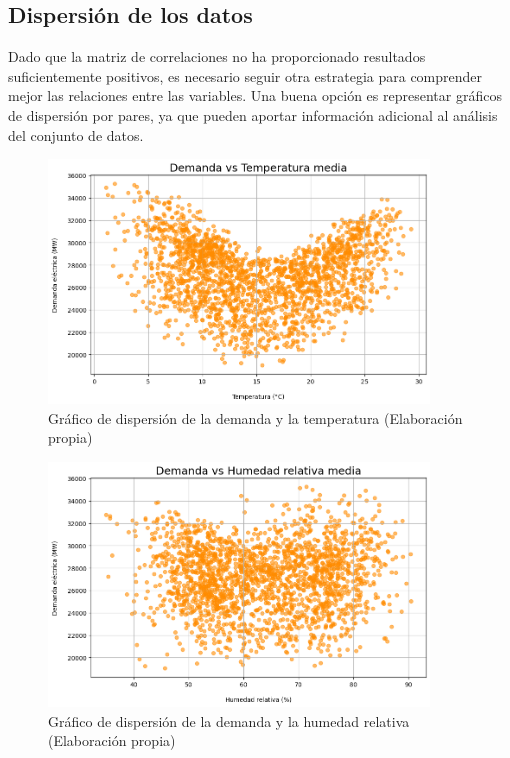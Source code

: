 \documentclass[12pt,a4paper]{report}
\begin{document}
\subsection{Dispersión de los datos}

Dado que la matriz de correlaciones no ha proporcionado resultados suficientemente positivos, es necesario seguir otra estrategia para comprender mejor las relaciones entre las variables. Una buena opción es representar gráficos de dispersión por pares, ya que pueden aportar información adicional al análisis del conjunto de datos.

\begin{figure}[H]
    \centering
    \includegraphics[width=0.9\textwidth]{Images/tfm-3.2A.png}
    \caption{Gráfico de dispersión de la demanda y la temperatura (Elaboración propia)}
    \label{fig:demvstemp}
\end{figure}

\begin{figure}[H]
    \centering
    \includegraphics[width=0.9\textwidth]{Images/tfm-3.2B.png}
    \caption{Gráfico de dispersión de la demanda y la humedad relativa (Elaboración propia)}
    \label{fig:demvshum}
\end{figure}
\end{document}
